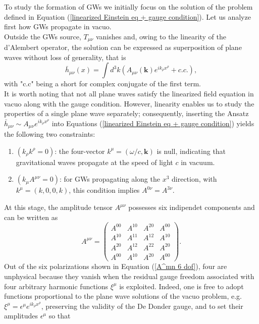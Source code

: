 \documentclass[12pt,twoside,openany]{book}
\begin{document}
To study the formation of GWs we initially focus on the solution of the problem defined in Equation (\ref{linearized Einstein eq + gauge condition}). Let us analyze first how GWs propagate in vacuo.\\Outside the GWs source, $T_{\mu\nu}$ vanishes and, owing to the linearity of the d’Alembert operator, the solution can be expressed as superposition of plane waves without loss of generality, that is
\begin{equation}
    \bar{h}_{\mu\nu}(x)=\int d^3k (A_{\mu\nu}(\mathbf{k})e^{ik_\rho x^\rho}+c.c.),
\end{equation}
with "c.c" being a short for complex conjugate of the first term.\\It is worth noting that not all plane waves satisfy the linearized field equation in vacuo along with the gauge condition. However, linearity enables us to study the properties of a single plane wave separately; consequently, inserting the Ansatz $\bar{h}_{\mu\nu}\sim A_{\mu\nu}e^{ik_\rho x^\rho}$ into Equations (\ref{linearized Einstein eq + gauge condition}) yields the following two constraints:
\begin{enumerate}
    \item $(k_\rho k^\rho=0)$: the four-vector $k^\mu=(\omega/c,\mathbf{k})$ is null, indicating that gravitational waves propagate at the speed of light $c$ in vacuum.
    \item $(k_\mu A^{\mu\nu}=0)$: for GWs propagating along the $x^3$ direction, with $k^\mu=(k,0,0,k)$, this condition implies $A^{0\nu}=A^{3\nu}$.
\end{enumerate}
At this stage, the amplitude tensor $A^{\mu\nu}$ possesses six indipendet components and can be written as
\begin{equation}\label{A^mn 6 dof}
A^{\mu\nu} =
\begin{pmatrix}
A^{00} & A^{10} & A^{20} & A^{00} \\
A^{10} & A^{11} & A^{12} & A^{10} \\
A^{20} & A^{12} & A^{22} & A^{20} \\
A^{00} & A^{10} & A^{20} & A^{00}
\end{pmatrix}.
\end{equation}
Out of the six polarizations shown in Equation (\ref{A^mn 6 dof}), four are unphysical because they vanish when the residual gauge freedom associated with four arbitrary harmonic functions $\xi^\mu$ is exploited. Indeed, one is free to adopt functions proportional to the plane wave solutions of the vacuo problem, e.g. $\xi^\mu=\epsilon^\mu e^{ik_\rho x^\rho}$, preserving the validity of the De Donder gauge, and to set their amplitudes $\epsilon^\mu$ so that
\end{document}
